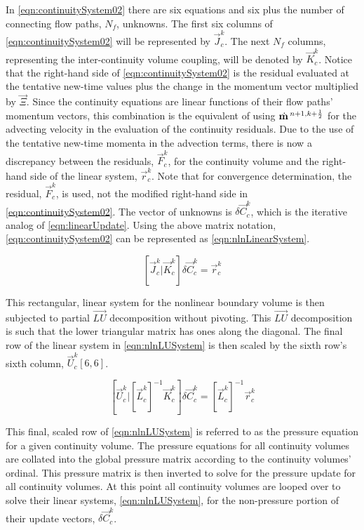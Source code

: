 In \eqref{eqn:continuitySystem02} there are six equations and six plus the number of connecting flow paths, $N_{f}$, unknowns.
The first six columns of \eqref{eqn:continuitySystem02} will be represented by $\vec{J}^{k}_{c}$.
The next $N_{f}$ columns, representing the inter-continuity volume coupling, will be denoted  by $\vec{K}^{k}_{c}$.
Notice that the right-hand side of \eqref{eqn:continuitySystem02} is the residual evaluated at the tentative new-time values plus the change in the momentum vector multiplied by $\vec{\Xi}$.
Since the continuity equations are linear functions of their flow paths' momentum vectors, this combination is the equivalent of using $\momVec{}^{n+1, k + \onehalf}$ for the advecting velocity in the evaluation of the continuity residuals.
Due to the use of the tentative new-time momenta in the advection terms, there is now a discrepancy between the residuals, $\vec{F}^{k}_{c}$, for the continuity volume and the right-hand side of the linear system, $\vec{r}^{k}_{c}$.
Note that for convergence determination, the residual, $\vec{F}^{k}_{c}$, is used, not the modified right-hand side in \eqref{eqn:continuitySystem02}.
The vector of unknowns is $\delta \vec{C}^{k}_{c}$, which is the iterative analog of \eqref{eqn:linearUpdate}.
Using the above matrix notation, \eqref{eqn:continuitySystem02} can be represented as \eqref{eqn:nlnLinearSystem}.

\begin{equation}
\label{eqn:nlnLinearSystem}
\left[ \vec{J}^{k}_{c} \vert \vec{K}^{k}_{c} \right] \delta \vec{C}_{c}^{k} = \vec{r}^{k}_{c}
\end{equation}

This rectangular, linear system for the nonlinear boundary volume is then subjected to partial $\vec{LU}$ decomposition without pivoting.
This $\vec{LU}$ decomposition is such that the lower triangular matrix has ones along the diagonal.
The final row of the linear system in \eqref{eqn:nlnLUSystem} is then scaled by the sixth row's sixth column, $\vec{U}^{k}_{c}[6,6]$.

\begin{equation}
\label{eqn:nlnLUSystem}
\left[ \vec{U}^{k}_{c} \vert \left[\vec{L}^{k}_{c}\right]^{-1}\vec{K}^{k}_{c} \right] \delta \vec{C}^{k}_{c} = \left[\vec{L}^{k}_{c}\right]^{-1}\vec{r}^{k}_{c}
\end{equation}

This final, scaled row of \eqref{eqn:nlnLUSystem} is referred to as the pressure equation for a given continuity volume.
The pressure equations for all continuity volumes are collated into the global pressure matrix according to the continuity volumes' ordinal.
This pressure matrix is then inverted to solve for the pressure update for all continuity volumes.
At this point all continuity volumes are looped over to solve their linear systems, \eqref{eqn:nlnLUSystem}, for the non-pressure portion of their update vectors, $\delta \vec{C}_{c}^{k}$.

